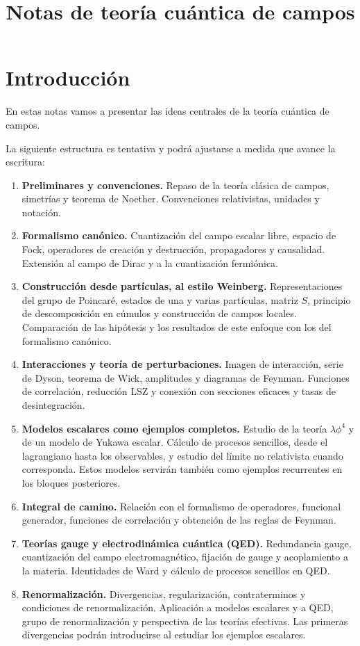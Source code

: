 \documentclass[11pt,a4paper,oneside,openany]{book}
\title{Notas de teoría cuántica de campos}
\author{}
\date{}
\theoremstyle{plain}
\theoremstyle{definition}
\theoremstyle{remark}
\begin{document}
\chapter{Introducción}

En estas notas vamos a presentar las ideas centrales de la teoría cuántica de campos.

La siguiente estructura es tentativa y podrá ajustarse a medida que avance
la escritura:

\begin{enumerate}
    \item \textbf{Preliminares y convenciones.}
    Repaso de la teoría clásica de campos, simetrías y teorema de Noether.
    Convenciones relativistas, unidades y notación.

    \item \textbf{Formalismo canónico.}
    Cuantización del campo escalar libre, espacio de Fock, operadores de
    creación y destrucción, propagadores y causalidad. Extensión al campo
    de Dirac y a la cuantización fermiónica.

    \item \textbf{Construcción desde partículas, al estilo Weinberg.}
    Representaciones del grupo de Poincaré, estados de una y varias
    partículas, matriz $S$, principio de descomposición en cúmulos y
    construcción de campos locales. Comparación de las hipótesis y los
    resultados de este enfoque con los del formalismo canónico.

    \item \textbf{Interacciones y teoría de perturbaciones.}
    Imagen de interacción, serie de Dyson, teorema de Wick, amplitudes y
    diagramas de Feynman. Funciones de correlación, reducción LSZ y conexión
    con secciones eficaces y tasas de desintegración.

    \item \textbf{Modelos escalares como ejemplos completos.}
    Estudio de la teoría $\lambda\phi^4$ y de un modelo de Yukawa escalar.
    Cálculo de procesos sencillos, desde el lagrangiano hasta los
    observables, y estudio del límite no relativista cuando corresponda.
    Estos modelos servirán también como ejemplos recurrentes en los
    bloques posteriores.

    \item \textbf{Integral de camino.}
    Relación con el formalismo de operadores, funcional generador,
    funciones de correlación y obtención de las reglas de Feynman.

    \item \textbf{Teorías gauge y electrodinámica cuántica (QED).}
    Redundancia gauge, cuantización del campo electromagnético, fijación
    de gauge y acoplamiento a la materia. Identidades de Ward y cálculo de
    procesos sencillos en QED.

    \item \textbf{Renormalización.}
    Divergencias, regularización, contraterminos y condiciones de
    renormalización. Aplicación a modelos escalares y a QED, grupo de
    renormalización y perspectiva de las teorías efectivas. Las primeras
    divergencias podrán introducirse al estudiar los ejemplos escalares.
\end{enumerate}
\end{document}
